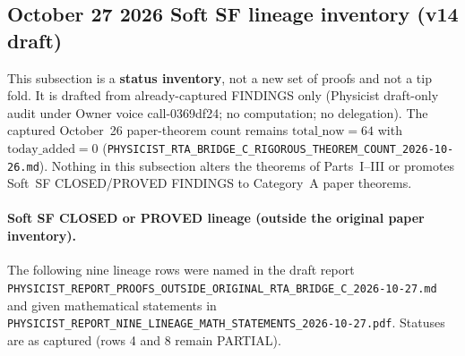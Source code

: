 \subsection{October 27 2026 Soft SF lineage inventory (v14 draft)}\label{sec:draft14}
This subsection is a \textbf{status inventory}, not a new set of proofs and not a tip fold.
It is drafted from already-captured FINDINGS only (Physicist draft-only audit under Owner voice call-0369df24; no computation; no delegation).
The captured October~26 paper-theorem count remains $\mathrm{total\_now}=64$ with $\mathrm{today\_added}=0$
(\texttt{PHYSICIST\_RTA\_BRIDGE\_C\_RIGOROUS\_THEOREM\_COUNT\_2026-10-26.md}).
Nothing in this subsection alters the theorems of Parts~I--III or promotes Soft~SF CLOSED/PROVED FINDINGS to Category~A paper theorems.

\paragraph{Soft SF CLOSED or PROVED lineage (outside the original paper inventory).}
The following nine lineage rows were named in the draft report
\texttt{PHYSICIST\_REPORT\_PROOFS\_OUTSIDE\_ORIGINAL\_RTA\_BRIDGE\_C\_2026-10-27.md}
and given mathematical statements in
\texttt{PHYSICIST\_REPORT\_NINE\_LINEAGE\_MATH\_STATEMENTS\_2026-10-27.pdf}.
Statuses are as captured (rows 4 and 8 remain PARTIAL).

